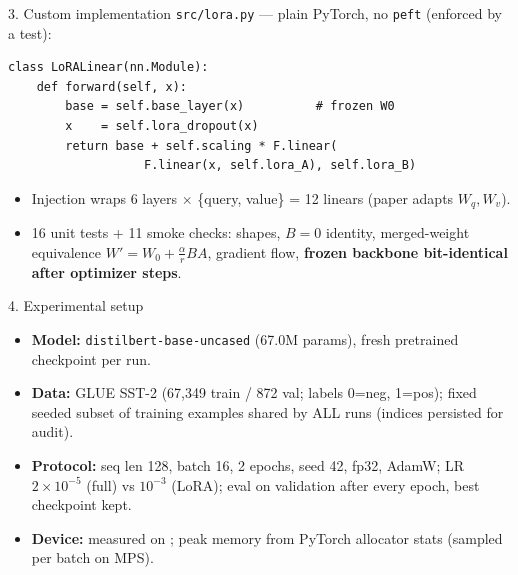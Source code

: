 \documentclass[aspectratio=169,10pt]{beamer}
\begin{document}
\begin{frame}[fragile]{3. Custom implementation}
\texttt{src/lora.py} --- plain PyTorch, no \texttt{peft} (enforced by a test):
\begin{verbatim}
class LoRALinear(nn.Module):
    def forward(self, x):
        base = self.base_layer(x)          # frozen W0
        x    = self.lora_dropout(x)
        return base + self.scaling * F.linear(
                   F.linear(x, self.lora_A), self.lora_B)
\end{verbatim}
\begin{itemize}
\item Injection wraps 6 layers $\times$ \{query, value\} = 12 linears
      (paper adapts $W_q, W_v$).
\item 16 unit tests + 11 smoke checks: shapes, $B{=}0$ identity,
      merged-weight equivalence $W'{=}W_0{+}\frac{\alpha}{r}BA$, gradient flow,
      \textbf{frozen backbone bit-identical after optimizer steps}.
\end{itemize}
\end{frame}

\begin{frame}{4. Experimental setup}
\begin{itemize}
\item \textbf{Model:} \texttt{distilbert-base-uncased} (67.0M params), fresh
      pretrained checkpoint per run.
\item \textbf{Data:} GLUE SST-2 (67,349 train / 872 val; labels 0=neg, 1=pos);
      fixed seeded subset of \SubsetSize{} training examples shared by ALL
      runs (indices persisted for audit).
\item \textbf{Protocol:} seq len 128, batch 16, 2 epochs, seed 42, fp32,
      AdamW; LR $2{\times}10^{-5}$ (full) vs $10^{-3}$ (LoRA); eval on
      validation after every epoch, best checkpoint kept.
\item \textbf{Device:} measured on \DeviceName{}; peak memory from PyTorch
      allocator stats (sampled per batch on MPS).
\end{itemize}
\end{frame}
\end{document}
